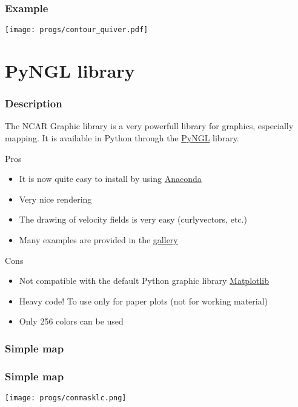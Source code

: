 \documentclass{beamer}
\begin{document}
\begin{frame}[fragile]
\frametitle{Example}
    \begin{center}
        \texttt{[image: progs/contour\_quiver.pdf]}
    \end{center}
\end{frame}


\section{PyNGL library}

\begin{frame}[fragile]
\frametitle{Description}
    The NCAR Graphic library is a very powerfull library for graphics, especially mapping. It is available in Python through the \textcolor{blue}{\href{https://www.pyngl.ucar.edu/}{PyNGL}} library.
    \footnotesize{
\begin{block}{Pros}
    \begin{itemize}
        \item{It is now quite easy to install by using \href{https://www.anaconda.com/}{Anaconda}}
        \item{Very nice rendering}
        \item{The drawing of velocity fields is very easy (curlyvectors, etc.)}
        \item{Many examples are provided in the \href{https://www.pyngl.ucar.edu/Examples/gallery.shtml}{gallery}}
    \end{itemize}
\end{block}
\begin{alertblock}{Cons}
    \begin{itemize}
        \item{Not compatible with the default Python graphic library \href{https://matplotlib.org/}{Matplotlib}}
        \item{Heavy code! To use only for paper plots (not for working material)}
        \item{Only 256 colors can be used}
    \end{itemize}
\end{alertblock}
}
\end{frame}

\begin{frame}[fragile]
\frametitle{Simple map}

\end{frame}

\begin{frame}[fragile]
\frametitle{Simple map}
    \begin{center}
    \texttt{[image: progs/conmasklc.png]}
    \end{center}
\end{frame}
\end{document}
